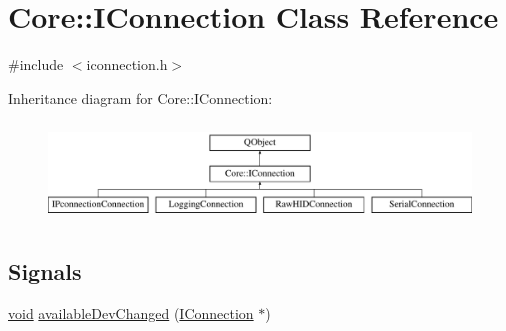 \hypertarget{class_core_1_1_i_connection}{\section{Core\-:\-:I\-Connection Class Reference}
\label{class_core_1_1_i_connection}
}


{\ttfamily \#include $<$iconnection.\-h$>$}

Inheritance diagram for Core\-:\-:I\-Connection\-:\begin{figure}[H]
\begin{center}
\leavevmode
\includegraphics[height=2.675159cm]{class_core_1_1_i_connection}
\end{center}
\end{figure}
\subsection*{Signals}
\begin{DoxyCompactItemize}
\item 
\hyperlink{group___u_a_v_objects_plugin_ga444cf2ff3f0ecbe028adce838d373f5c}{void} \hyperlink{group___core_plugin_ga79b76e167c73d83f42b79f51f66a9c38}{available\-Dev\-Changed} (\hyperlink{class_core_1_1_i_connection}{I\-Connection} $\ast$)
\end{DoxyCompactItemize}
